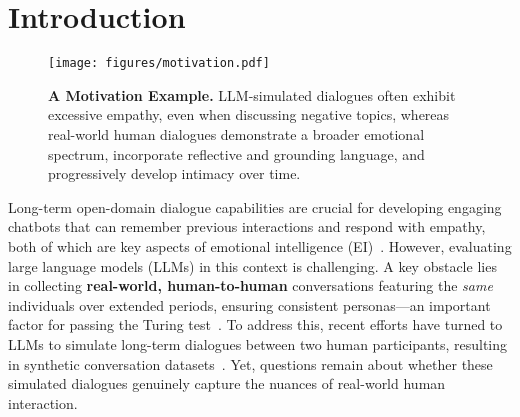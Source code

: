\section{Introduction}


\begin{figure}[t!]
    \centering
    \begin{minipage}{\columnwidth}
    \centering
    \texttt{[image: figures/motivation.pdf]}
\end{minipage}
    \vspace{-0.2cm}
    \caption{\textbf{A Motivation Example.} LLM-simulated dialogues often exhibit excessive empathy, even when discussing negative topics, whereas real-world human dialogues demonstrate a broader emotional spectrum, incorporate reflective and grounding language, and progressively develop intimacy over time.}
    \label{fig:motivation}
    \vspace{-0.5cm}
\end{figure}

Long-term open-domain dialogue capabilities are crucial for developing engaging chatbots that can remember previous interactions and respond with empathy, both of which are key aspects of emotional intelligence (EI)~\cite{goleman1998working, mayer2008emotional}.
However, evaluating large language models (LLMs) in this context is challenging.
A key obstacle lies in collecting \textbf{real-world, human-to-human} conversations featuring the \emph{same} individuals over extended periods, ensuring consistent personas—an important factor for passing the Turing test~\cite{turing2009computing, vinyals2015neural}.
To address this, recent efforts have turned to LLMs to simulate long-term dialogues between two human participants, resulting in synthetic conversation datasets~\cite{kim-etal-2023-soda, jang-etal-2023-conversation, zhong2024memorybank, du2024perltqa, maharana-etal-2024-evaluating}.
Yet, questions remain about whether these simulated dialogues genuinely capture the nuances of real-world human interaction.

